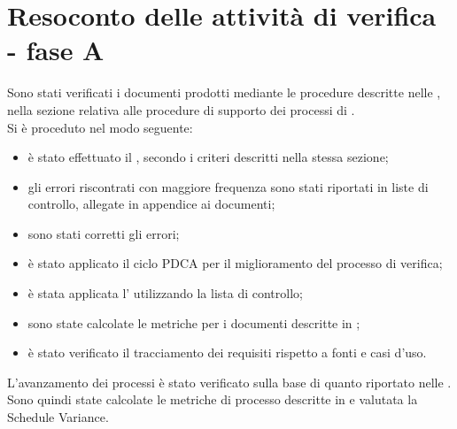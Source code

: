 \section{Resoconto delle attività di verifica - fase A}
Sono stati verificati i documenti prodotti mediante le procedure descritte nelle \NormeDiProgetto, nella sezione relativa alle procedure di supporto dei processi di \VV.\\
Si è proceduto nel modo seguente:\begin{itemize}
	\item è stato effettuato il , secondo i criteri descritti nella stessa sezione;
	\item gli errori riscontrati con maggiore frequenza sono stati riportati in liste di controllo, allegate in appendice ai documenti;
	\item sono stati corretti gli errori;
	\item è stato applicato il ciclo PDCA per il miglioramento del processo di verifica;
	\item è stata applicata l' utilizzando la lista di controllo;
	\item sono state calcolate le metriche per i documenti descritte in ;
	\item è stato verificato il tracciamento dei requisiti rispetto a fonti e casi d'uso.
\end{itemize}
L'avanzamento dei processi è stato verificato sulla base di quanto riportato nelle \NormeDiProgetto. Sono quindi state calcolate le metriche di processo descritte in  e valutata la Schedule Variance.
